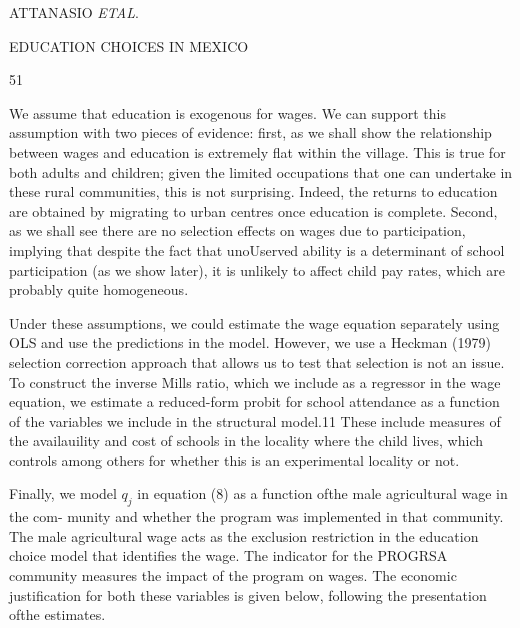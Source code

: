 ATTANASIO {\it ETAL}.

EDUCATION CHOICES IN MEXICO

51

We assume that education is exogenous for wages. We can support this assumption with two pieces of evidence: first, as we shall show the relationship between wages and education is extremely flat within the village. This is true for both adults and children; given the limited occupations that one can undertake in these rural communities, this is not surprising. Indeed, the returns to education are obtained by migrating to urban centres once education is complete. Second, as we shall see there are no selection effects on wages due to participation, implying that despite the fact that unoUserved ability is a determinant of school participation (as we show later), it is unlikely to affect child pay rates, which are probably quite homogeneous.

Under these assumptions, we could estimate the wage equation separately using OLS and use the predictions in the model. However, we use a Heckman (1979) selection correction approach that allows us to test that selection is not an issue. To construct the inverse Mills ratio, which we include as a regressor in the wage equation, we estimate a reduced-form probit for school attendance as a function of the variables we include in the structural model.11 These include measures of the availauility and cost of schools in the locality where the child lives, which controls among others for whether this is an experimental locality or not.

Finally, we model $q_{j}$ in equation (8) as a function ofthe male agricultural wage in the com- munity and whether the program was implemented in that community. The male agricultural wage acts as the exclusion restriction in the education choice model that identifies the wage. The indicator for the PROGRSA community measures the impact of the program on wages. The economic justification for both these variables is given below, following the presentation ofthe estimates.

